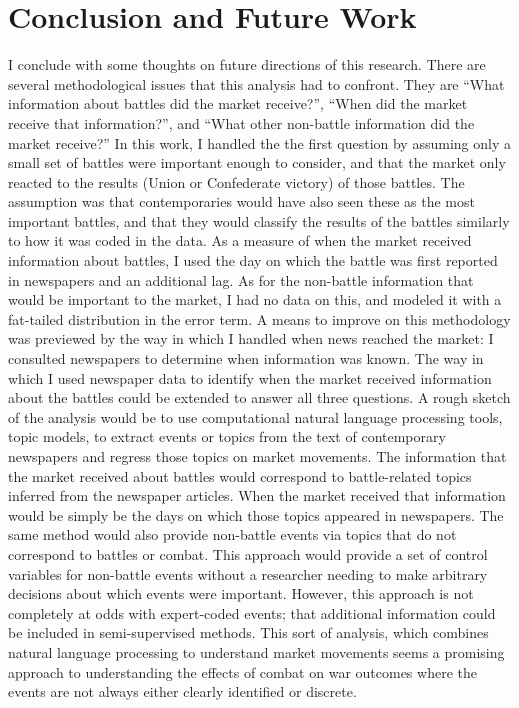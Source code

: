 

\section{Conclusion and Future Work}
\label{sec:conclusion}

I conclude with some thoughts on future directions of this research.
There are several methodological issues that this analysis had to confront.
They are ``What information about battles did the market receive?'', ``When did the market receive that information?'', and ``What other non-battle information did the market receive?''
In this work, I handled the the first question by assuming only a small set of battles were important enough to consider, and that the market only reacted to the results (Union or Confederate victory) of those battles.
The assumption was that contemporaries would have also seen these as the most important battles, and that they would classify the results of the battles similarly to how it was coded in the data.
As a measure of when the market received information about battles, I used the day on which the battle was first reported in newspapers and an additional lag.
As for the non-battle information that would be important to the market, I had no data on this, and modeled it with a fat-tailed distribution in the error term.
A means to improve on this methodology was previewed by the way in which I handled when news reached the market: I consulted newspapers to determine when information was known.
The way in which I used newspaper data to identify when the market received information about the battles could be extended to answer all three questions.
A rough sketch of the analysis would be to use computational natural language processing tools, \eg{}topic models, to extract events or topics from the text of contemporary newspapers and regress those topics on market movements.
The information that the market received about battles would correspond to battle-related topics inferred from the newspaper articles.
When the market received that information would be simply be the days on which those topics appeared in newspapers.
The same method  would also provide non-battle events via topics that do not correspond to battles or combat.
This approach would provide a set of control variables for non-battle events without a researcher needing to make arbitrary decisions about which events were important.
However, this approach is not completely at odds with expert-coded events; that additional information could be included in semi-supervised methods.
This sort of analysis, which combines natural language processing to understand market movements seems a promising approach to understanding the effects of combat on war outcomes where the events are not always either clearly identified or discrete. 


